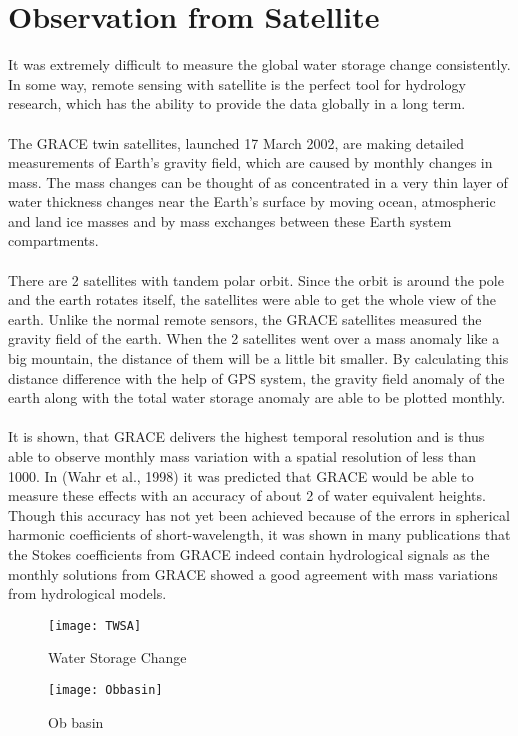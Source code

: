 \section{Observation from Satellite}
It was extremely difficult to measure the global water storage change consistently. In some way, remote sensing with satellite is the perfect tool for hydrology research, which has the ability to provide the data globally in a long term.\\\\
The GRACE twin satellites, launched 17 March 2002, are making detailed measurements of Earth's gravity field, which are caused by monthly changes in mass. The mass changes can be thought of as concentrated in a very thin layer of water thickness changes near the Earth's surface by moving ocean, atmospheric and land ice masses and by mass exchanges between these Earth system compartments. \\\\
There are 2 satellites with tandem polar orbit. Since the orbit is around the pole and the earth rotates itself, the satellites were able to get the whole view of the earth. Unlike the normal remote sensors, the GRACE satellites measured the gravity field of the earth. When the 2 satellites went over a mass anomaly like a big mountain, the distance of them will be a little bit smaller. By calculating this distance difference with the help of GPS system, the gravity field anomaly of the earth along with the total water storage anomaly are able to be plotted monthly. \\\\
It is shown, that GRACE delivers the highest temporal resolution and is thus able to observe monthly mass variation with a spatial resolution of less than 1000. In (Wahr et al., 1998) it was predicted that GRACE would be able to measure these effects with an accuracy of about 2 of water equivalent heights. Though this accuracy has not yet been achieved because of the errors in spherical harmonic coefficients of short-wavelength, it was shown in many publications that the Stokes coefficients from GRACE indeed contain hydrological signals as the monthly solutions from GRACE showed a good agreement with mass variations from hydrological models.
\begin{figure}[htbp]
	\centering
	\texttt{[image: TWSA]} %
	\caption{Water Storage Change} 
	\label{fig:TWSA}
\end{figure}
\begin{figure}[ht]
	\centering
	\texttt{[image: Obbasin]} %
	\caption{Ob basin} 
	\label{fig:Obbasin}
\end{figure}\\
